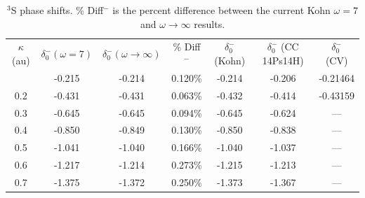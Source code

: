 \documentclass[preprint,showpacs,preprintnumbers,amsmath,amssymb]{revtex4}
\begin{document}
\begin{table}[H]
\centering
\begin{ruledtabular}
\begin{tabular}{c c c c c c c}
$\kappa$ (au) & $\delta_0^- (\omega = 7)$ & $\delta_0^- (\omega \rightarrow \infty)$ & \% Diff$^-$ & $\delta_0^-$ (Kohn) \cite{VanReeth2003} & $\delta_0^-$ (CC 14Ps14H) \cite{Blackwood2002} & $\delta_0^-$ (CV) \cite{Zhang2012} \\
\colrule
0.1 & -0.215 & -0.214 & 0.120\% & -0.214 & -0.206 & -0.21464 \\
0.2 & -0.431 & -0.431 & 0.063\% & -0.432 & -0.414 & -0.43159 \\
0.3 & -0.645 & -0.645 & 0.094\% & -0.645 & -0.624 & --- \\
0.4 & -0.850 & -0.849 & 0.130\% & -0.850 & -0.838 & --- \\
0.5 & -1.041 & -1.040 & 0.166\% & -1.040 & -1.037 & --- \\
0.6 & -1.217 & -1.214 & 0.273\% & -1.215 & -1.213 & --- \\
0.7 & -1.375 & -1.372 & 0.250\% & -1.373 & -1.367 & --- \\
\end{tabular}
\end{ruledtabular}
\caption{$^3$S phase shifts. \% Diff$^-$ is the percent difference between the current Kohn $\omega = 7$ and $\omega \rightarrow \infty$ results.}
\label{tab:SWaveTripletPhase}
\end{table}
\end{document}
